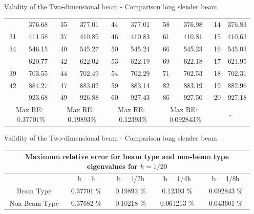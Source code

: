 \documentclass[8pt]{beamer}
\begin{document}
\begin{frame}{Validity of the Two-dimensional beam - Comparison long slender beam}
\begin{table}[ht]
{{\begin{tabular}{|cc|cc|cc|cc||cc|}
                    \rowcolor{lightgray}{30} & 376.68 & {35} & 377.01 & {44} & 377.01 & {58} & 376.98 & {14} & {376.83} \\
                    {31} & 411.58 & {37} & 410.89 & {46} & 410.83 & {61} & 410.81 & {15} & {410.63} \\
                    {34} & 546.15 & {40} & 545.27 & {50} & 545.24 & {66} & 545.23 & {16} & {545.03} \\
                    \rowcolor{lightgray}{37} & 620.77 & {42} & 622.02 & {53} & 622.19 & {69} & 622.18 & {17} & {621.95} \\
                    {39} & 703.55 & {44} & 702.49 & {54} & 702.29 & {71} & 702.53 & {18} & {702.31} \\
                    {42} & 884.27 & {47} & 883.02 & {59} & 883.14 & {82} & 883.19 & {19} & {882.96} \\
                    \rowcolor{lightgray}{44} & 923.68 & {49} & 926.88 & {60} & 927.43 & {86} & 927.50 & {20} & {927.18} \\
                    \hline
                    \hline
                    \multicolumn{2}{|c|}{Max RE: \  0.37701\%} &\multicolumn{2}{c|}{Max RE: \ 0.19893\%}  & \multicolumn{2}{c|}{Max RE: \  0.12393\%}  & \multicolumn{2}{c||}{Max RE: \ 0.092843\%}& \multicolumn{2}{c|}{-} \\
                    \hline
                \end{tabular}%
                \label{tab:2v3_2}%
            }}
            \end{table}%
        \end{frame}

        \begin{frame}{Validity of the Two-dimensional beam - Comparison long slender beam}
            \begin{table}[htbp]
                \centering
                \begin{tabular}{|c|cccc|}
                    \hline
                    \multicolumn{5}{|c|}{Maximum relative error for beam type and non-beam type eigenvalues for $h = 1/20$} \\
                    \hline
                    \hline
                    & {b = h} & {b = 1/2h} & {b = 1/4h} & {b = 1/8h} \\
                    \hline
                    Beam Type & 0.37701 \% & 0.19893 \% & 0.12393 \% & 0.092843 \% \\
                    Non-Beam Type & 0.37682 \% & 0.10218 \% & 0.061213 \% & 0.043601 \% \\
                    \hline
                \end{tabular}%
                \label{tab:2v3_2_split}%
            \end{table}%
        \end{frame}
\end{document}
